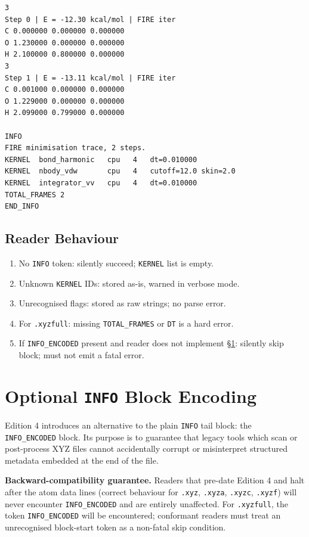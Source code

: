 \documentclass[12pt, a4paper, oneside]{article}
\begin{document}
\begin{lstlisting}[language={},frame=single]
3
Step 0 | E = -12.30 kcal/mol | FIRE iter
C 0.000000 0.000000 0.000000
O 1.230000 0.000000 0.000000
H 2.100000 0.800000 0.000000
3
Step 1 | E = -13.11 kcal/mol | FIRE iter
C 0.001000 0.000000 0.000000
O 1.229000 0.000000 0.000000
H 2.099000 0.799000 0.000000

INFO
FIRE minimisation trace, 2 steps.
KERNEL  bond_harmonic   cpu   4   dt=0.010000
KERNEL  nbody_vdw       cpu   4   cutoff=12.0 skin=2.0
KERNEL  integrator_vv   cpu   4   dt=0.010000
TOTAL_FRAMES 2
END_INFO
\end{lstlisting}

\subsection{Reader Behaviour}

\begin{enumerate}
  \item No \texttt{INFO} token: silently succeed; \texttt{KERNEL} list is empty.
  \item Unknown \texttt{KERNEL} IDs: stored as-is, warned in verbose mode.
  \item Unrecognised flags: stored as raw strings; no parse error.
  \item For \texttt{.xyzfull}: missing \texttt{TOTAL\_FRAMES} or \texttt{DT} is a hard error.
  \item If \texttt{INFO\_ENCODED} present and reader does not implement
        \S\ref{sec:info_encoding}: silently skip block; must not emit a fatal error.
\end{enumerate}

\section{Optional \texttt{INFO} Block Encoding}
\label{sec:info_encoding}

Edition 4 introduces an alternative to the plain \texttt{INFO} tail block:
the \texttt{INFO\_ENCODED} block.  Its purpose is to guarantee that legacy
tools which scan or post-process XYZ files cannot accidentally corrupt or
misinterpret structured metadata embedded at the end of the file.

\begin{tcolorbox}[
  colback=enc4greenlight, colframe=enc4green,
  boxrule=0.8pt, arc=3pt, left=6pt, right=6pt, top=5pt, bottom=5pt
]
\textbf{Backward-compatibility guarantee.}
Readers that pre-date Edition 4 and halt after the atom data lines
(correct behaviour for \texttt{.xyz}, \texttt{.xyza}, \texttt{.xyzc}, \texttt{.xyzf})
will never encounter \texttt{INFO\_ENCODED} and are entirely unaffected.
For \texttt{.xyzfull}, the token \texttt{INFO\_ENCODED} will be encountered;
conformant readers must treat an unrecognised block-start token as a
non-fatal skip condition.
\end{tcolorbox}
\end{document}
